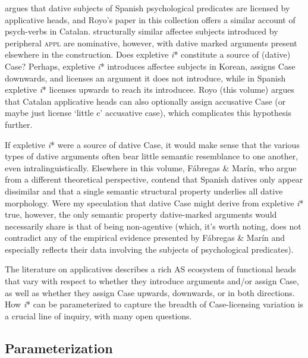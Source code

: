 \documentclass[output=paper,modfonts,nonflat]{langsci/langscibook}
\begin{document}
\citet{Cuervo2003,Cuervo2010} argues that dative subjects of Spanish psychological predicates are licensed by applicative heads, and Royo’s paper in this collection offers a similar account of psych-verbs in Catalan.  structurally similar affectee subjects introduced by peripheral \textsc{appl} are nominative, however, with dative marked arguments present elsewhere in the construction. Does expletive \textit{i}* constitute a source of (dative) Case? Perhaps, expletive \textit{i}* introduces affectee subjects in Korean, assigns Case downwards, and licenses an argument it does not introduce, while in Spanish expletive \textit{i}* licenses upwards to reach its introducee. Royo (this volume) argues that Catalan applicative heads can also optionally assign accusative Case (or maybe just license ‘little c’ accusative case), which complicates this hypothesis further. 



If expletive \textit{i}* were a source of dative Case, it would make sense that the various types of dative arguments often bear little semantic resemblance to one another, even intralinguistically. Elsewhere in this volume, Fábregas \& Marín, who argue from a different theoretical perspective, contend that Spanish datives only appear dissimilar and that a single semantic structural property underlies all dative morphology. Were my speculation that dative Case might derive from expletive \textit{i}* true, however, the only semantic property dative-marked arguments would necessarily share is that of being non-agentive (which, it’s worth noting, does not contradict any of the empirical evidence presented by Fábregas \& Marín and especially reflects their data involving the subjects of psychological predicates). 



The literature on applicatives describes a rich AS ecosystem of functional heads that vary with respect to whether they introduce arguments and/or assign Case, as well as whether they assign Case upwards, downwards, or in both directions. How \textit{i}* can be parameterized to capture the breadth of Case-licensing variation is a crucial line of inquiry, with many open questions.

\subsection{Parameterization}\label{sec:wechsler:4.3}
\end{document}
